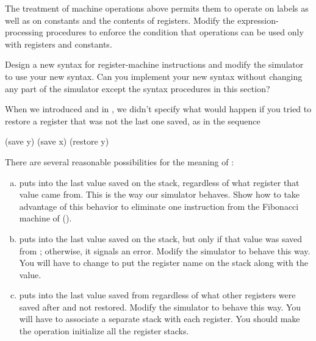 \begin{exerciseGroup}
\label{Exercise 5.9}
 The treatment of machine operations
above permits them to operate on labels as well as on constants and the
contents of registers.  Modify the expression-processing procedures to enforce
the condition that operations can be used only with registers and constants.

\label{Exercise 5.10}
 Design a new syntax for
register-machine instructions and modify the simulator to use your new syntax.
Can you implement your new syntax without changing any part of the simulator
except the syntax procedures in this section?

\label{Exercise 5.11}
 When we introduced 
and  in , we didn't specify what would happen
if you tried to restore a register that was not the last one saved, as in the
sequence

\begin{codeBlock}
(save y)  (save x)  (restore y)
\end{codeBlock}

There are several reasonable possibilities for the meaning of :

\begin{enumerate}[a.]

\item
{} puts into  the last value saved on the stack,
regardless of what register that value came from.  This is the way our
simulator behaves.  Show how to take advantage of this behavior to eliminate
one instruction from the Fibonacci machine of  ().

\item
{} puts into  the last value saved on the stack, but
only if that value was saved from ; otherwise, it signals an error.
Modify the simulator to behave this way.  You will have to change 
to put the register name on the stack along with the value.

\item
{} puts into  the last value saved from 
regardless of what other registers were saved after  and not restored.
Modify the simulator to behave this way.  You will have to associate a separate
stack with each register.  You should make the 
operation initialize all the register stacks.


\end{enumerate}
\end{exerciseGroup}

